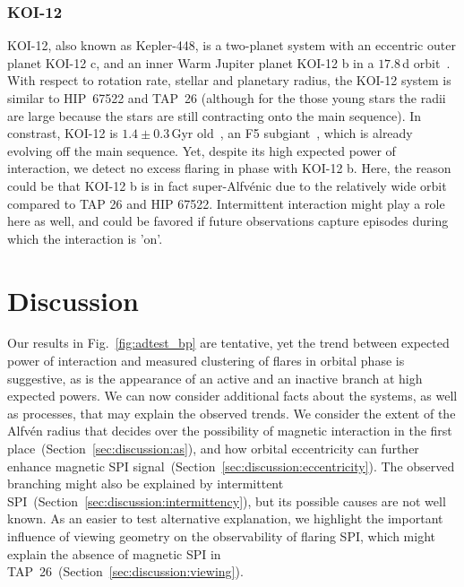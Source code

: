 \documentclass[twocolumn]{aastex631}
\begin{document}
\subsubsection{KOI-12}
\label{sec:results:individualstars:koi12}
KOI-12, also known as Kepler-448, is a two-planet system with an eccentric outer planet KOI-12 c, and an inner Warm Jupiter planet KOI-12 b in a $17.8\,$d orbit~\citep{masuda2017eccentric}. With respect to rotation rate, stellar and planetary radius, the KOI-12 system is similar to HIP~67522 and TAP~26 (although for the those young stars the radii are large because the stars are still contracting onto the main sequence). In constrast, KOI-12 is $1.4\pm0.3\,$Gyr old~\citep{bourrier2015sophie}, an F5 subgiant~\citep{frasca2016activity}, which is already evolving off the main sequence. Yet, despite its high expected power of interaction, we detect no excess flaring in phase with KOI-12 b. Here, the reason could be that KOI-12 b is in fact super-Alfv\'enic due to the relatively wide orbit compared to TAP 26 and HIP 67522. Intermittent interaction might play a role here as well, and could be favored if future observations capture episodes during which the interaction is 'on'.





\section{Discussion}
\label{sec:discussion}

Our results in Fig.~\ref{fig:adtest_bp} are tentative, yet the trend between expected power of interaction and measured clustering of flares in orbital phase is suggestive, as is the appearance of an active and an inactive branch at high expected powers. We can now consider additional facts about the systems, as well as processes, that may explain the observed trends. We consider the extent of the Alfv\'en radius that decides over the possibility of magnetic interaction in the first place~(Section~\ref{sec:discussion:as}), and how orbital eccentricity can further enhance magnetic SPI signal~(Section~\ref{sec:discussion:eccentricity}). The observed branching might also be explained by intermittent SPI~(Section~\ref{sec:discussion:intermittency}), but its possible causes are not well known. As an easier to test alternative explanation, we highlight the important influence of viewing geometry on the observability of flaring SPI, which might explain the absence of magnetic SPI in TAP~26~(Section~\ref{sec:discussion:viewing}). 
\end{document}
